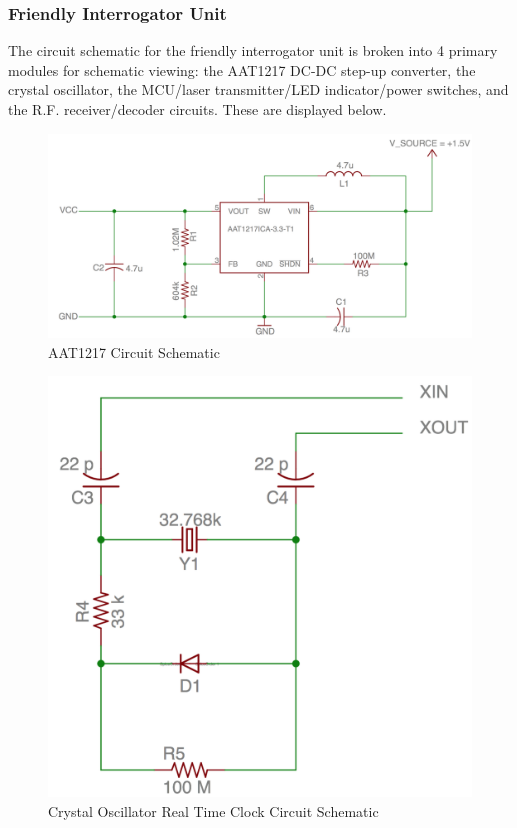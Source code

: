 \documentclass[letterpaper,10pt]{article}
\begin{document}
\begin{spacing}{1.15}
\subsubsection{Friendly Interrogator Unit}
The circuit schematic for the friendly interrogator unit is broken into 4 primary modules for schematic viewing: the AAT1217 DC-DC step-up converter, the crystal oscillator, the MCU/laser transmitter/LED indicator/power switches, and the R.F. receiver/decoder circuits. These are displayed below.
\begin{figure} [H]
	\centering
	\includegraphics[scale=0.35]{Voltage_Converter_Schematic.png}
	\caption{AAT1217 Circuit Schematic\label{fig:voltage-converter-schematic}}
\end{figure}

\begin{figure} [H]
	\centering
	\includegraphics[scale=0.35]{Crystal_Oscillator_Schematic.png}
	\caption{Crystal Oscillator Real Time Clock Circuit Schematic\label{fig:crystal-oscillator-schematic}}
\end{figure}


\end{spacing}
\end{document}
